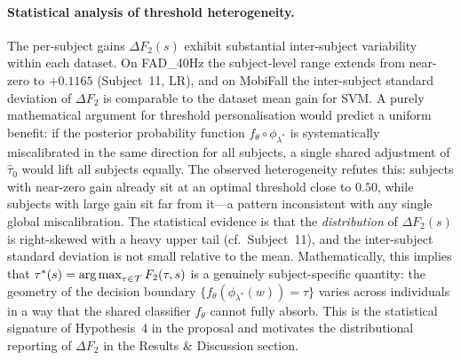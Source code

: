\paragraph{Statistical analysis of threshold heterogeneity.}
The per-subject gains $\Delta F_2(s)$ exhibit substantial inter-subject variability within
each dataset.  On FAD\_40Hz the subject-level range extends from near-zero to
$+0.1165$ (Subject~11, LR), and on MobiFall the inter-subject standard deviation of
$\Delta F_2$ is comparable to the dataset mean gain for SVM.  A purely mathematical
argument for threshold personalisation would predict a uniform benefit: if the posterior
probability function $f_\theta\circ\phi_{\lambda^*}$ is systematically miscalibrated in
the same direction for all subjects, a single shared adjustment of $\hat\tau_0$
would lift all subjects equally.  The observed heterogeneity refutes this: subjects with
near-zero gain already sit at an optimal threshold close to $0.50$, while subjects with
large gain sit far from it---a pattern inconsistent with any single global miscalibration.
The statistical evidence is that the \emph{distribution} of $\Delta F_2(s)$ is
right-skewed with a heavy upper tail (cf.\ Subject~11), and the inter-subject standard
deviation is not small relative to the mean.  Mathematically, this implies that
$\tau^*(s) = \operatorname*{arg\,max}_{\tau\in\mathcal{T}}F_2(\tau,s)$ is a genuinely subject-specific
quantity: the geometry of the decision boundary $\{f_\theta(\phi_{\lambda^*}(w))=\tau\}$
varies across individuals in a way that the shared classifier $f_\theta$ cannot
fully absorb.  This is the statistical signature of Hypothesis~4 in the proposal and
motivates the distributional reporting of $\Delta F_2$ in the Results \& Discussion
section.



